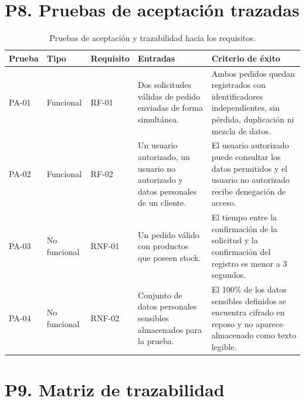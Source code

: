 \documentclass[12pt,a4paper]{article}
\begin{document}
\section{P8. Pruebas de aceptación trazadas}

\begin{table}[H]
\centering
\scriptsize
\begin{tabularx}{\textwidth}{|p{1.4cm}|p{1.7cm}|p{2cm}|X|X|}
\hline
\textbf{Prueba} & \textbf{Tipo} & \textbf{Requisito} & \textbf{Entradas} & \textbf{Criterio de éxito} \\
\hline
PA-01 & Funcional & RF-01 & Dos solicitudes válidas de pedido enviadas de forma simultánea. & Ambos pedidos quedan registrados con identificadores independientes, sin pérdida, duplicación ni mezcla de datos. \\
\hline
PA-02 & Funcional & RF-02 & Un usuario autorizado, un usuario no autorizado y datos personales de un cliente. & El usuario autorizado puede consultar los datos permitidos y el usuario no autorizado recibe denegación de acceso. \\
\hline
PA-03 & No funcional & RNF-01 & Un pedido válido con productos que poseen stock. & El tiempo entre la confirmación de la solicitud y la confirmación del registro es menor a 3 segundos. \\
\hline
PA-04 & No funcional & RNF-02 & Conjunto de datos personales sensibles almacenados para la prueba. & El 100\% de los datos sensibles definidos se encuentra cifrado en reposo y no aparece almacenado como texto legible. \\
\hline
\end{tabularx}
\caption{Pruebas de aceptación y trazabilidad hacia los requisitos.}
\end{table}

\section{P9. Matriz de trazabilidad}
\end{document}
